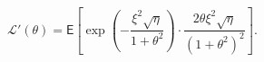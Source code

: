 $$
\mathcal{L}'(\theta)
= \mathsf{E}\left[
\exp\left(-\frac{\xi^2\sqrt{\eta}}{1+\theta^2}\right)
\cdot \frac{2\theta\xi^2\sqrt{\eta}}{(1+\theta^2)^2}
\right].
$$
